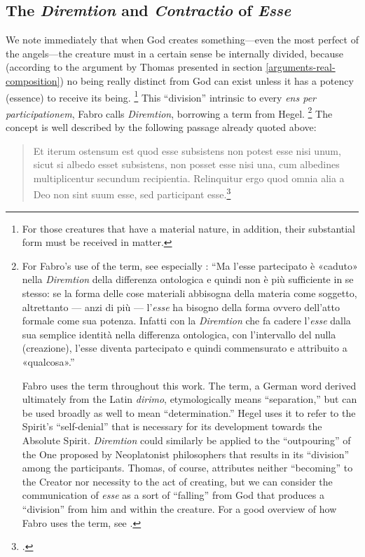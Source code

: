 \subsection{The \emph{Diremtion} and \emph{Contractio} of \emph{Esse}}
\label{sec:diremtion-contractio}

We note immediately that when God creates something---even the most perfect of the angels---the creature must in a certain sense be internally divided, because (according to the argument by Thomas presented in section \ref{arguments-real-composition}) no being really distinct from God can exist unless it has a potency (essence) to receive its being.%
%
\footnote{For those creatures that have a material nature, in addition, their substantial form must be received in matter.} This ``division'' intrinsic to every \emph{ens per participationem}, Fabro calls \emph{Diremtion}, borrowing a term from Hegel.%
%
\footnote{For Fabro's use of the term, see especially \cite[350]{fabro:partecipazione}: ``Ma l'esse partecipato è «caduto» nella \emph{Diremtion} della differenza ontologica e quindi non è più sufficiente in se stesso: se la forma delle cose materiali abbisogna della materia come soggetto, altrettanto --- anzi di più --- l'\emph{esse} ha bisogno della forma ovvero dell'atto formale come sua potenza. Infatti con la \emph{Diremtion} che fa cadere l'\emph{esse} dalla sua semplice identità nella differenza ontologica, con l'intervallo del nulla (creazione), l'esse diventa partecipato e quindi commensurato e attribuito a «qualcosa».''

Fabro uses the term throughout this work. The term, a German word derived ultimately from the Latin \emph{dirimo}, etymologically means ``separation,'' but can be used broadly as well to mean ``determination.'' Hegel uses it to refer to the Spirit's ``self-denial'' that is necessary for its development towards the Absolute Spirit. \emph{Diremtion} could similarly be applied to the ``outpouring'' of the One proposed by Neoplatonist philosophers that results in its ``division'' among the participants. Thomas, of course, attributes neither ``becoming'' to the Creator nor necessity to the act of creating, but we can consider the communication of \emph{esse} as a sort of ``falling'' from God that produces a ``division'' from him and within the creature.
For a good overview of how Fabro uses the term, see \cite[191--196]{mitchell:being}.}
%
The concept is well described by the following passage already quoted above: 
\begin{quotation}
Et iterum ostensum est quod esse subsistens non potest esse nisi unum, sicut si albedo esset subsistens, non posset esse nisi una, cum albedines multiplicentur secundum recipientia. Relinquitur ergo quod omnia alia a Deo non sint suum esse, sed participant esse.\footcite[I, q.~44, a.~1, co.]{st:summa}
\end{quotation}
